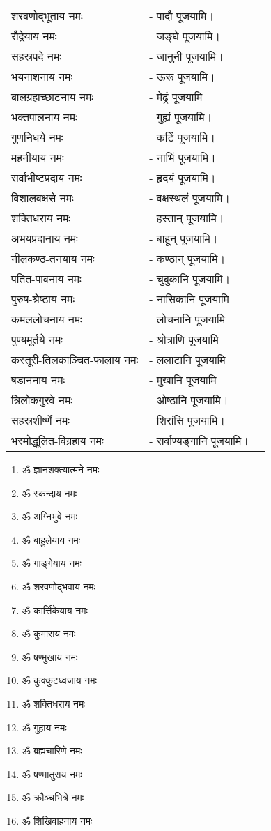 \begin{tabular}{lll}
शरवणोद्भूताय नमः & - पादौ पूजयामि।\\
रौद्रेयाय नमः &- जङ्घे पूजयामि।\\
सहस्रपदे नमः &- जानुनी पूजयामि।\\
भयनाशनाय नमः & - ऊरू पूजयामि।\\
बालग्रहाच्छाटनाय नमः & - मेढ्रं पूजयामि \\
भक्तपालनाय नमः & - गुह्यं पूजयामि।\\
गुणनिधये नमः & - कटिं पूजयामि।\\
महनीयाय नमः & - नाभिं पूजयामि।\\
सर्वाभीष्टप्रदाय नमः & - हृदयं पूजयामि।\\
विशालवक्षसे नमः & - वक्षस्थलं पूजयामि।\\
शक्तिधराय नमः & - हस्तान् पूजयामि।\\
अभयप्रदानाय नमः & - बाहून् पूजयामि।\\
नीलकण्ठ-तनयाय नमः & - कण्ठान् पूजयामि।\\
पतित-पावनाय नमः & - चुबुकानि पूजयामि।\\
पुरुष-श्रेष्ठाय नमः & - नासिकानि पूजयामि\\
कमललोचनाय नमः & - लोचनानि पूजयामि\\
पुण्यमूर्तये नमः & - श्रोत्राणि पूजयामि\\
कस्तूरी-तिलकाञ्चित-फालाय नमः & - ललाटानि पूजयामि\\
षडाननाय नमः & - मुखानि पूजयामि\\
त्रिलोकगुरवे नमः & - ओष्ठानि पूजयामि।\\
सहस्रशीर्ष्णे नमः & - शिरांसि पूजयामि।\\
भस्मोद्धूलित-विग्रहाय नमः & - सर्वाण्यङ्गानि पूजयामि। \\
\end{tabular}

\begin{multicols}{2}
\begin{enumerate}
\item ॐ ज्ञानशक्त्यात्मने नमः
\item ॐ स्कन्दाय नमः
\item ॐ अग्निभुवे नमः
\item ॐ बाहुलेयाय नमः
\item ॐ गाङ्गेयाय नमः
\item ॐ शरवणोद्भवाय नमः
\item ॐ कार्त्तिकेयाय नमः
\item ॐ कुमाराय नमः
\item ॐ षण्मुखाय नमः
\item ॐ कुक्कुटध्वजाय नमः
\item ॐ शक्तिधराय नमः
\item ॐ गुहाय नमः
\item ॐ ब्रह्मचारिणे नमः
\item ॐ षण्मातुराय नमः
\item ॐ क्रौञ्चभित्रे नमः
\item ॐ शिखिवाहनाय नमः
\end{enumerate}
\end{multicols}

